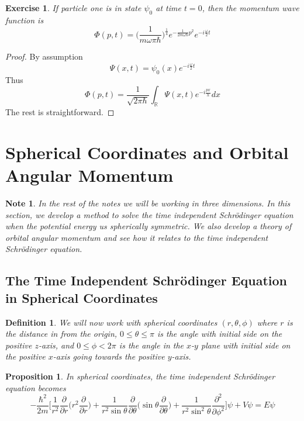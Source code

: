 \documentclass[12pt]{amsart}
\newtheorem{prop}[thm]{Proposition}
\newtheorem{defn}[thm]{Definition}
\newtheorem{note}[thm]{Note}
\newtheorem{ex}[thm]{Exercise}
\newcommand{\sch}{Schr\"{o}dinger }
\newcommand{\om}{\omega}
\newcommand{\R}{\mathbb{R}}
\newcommand{\p}[1]{\frac{\partial}{\partial{#1}}}
\begin{document}
\begin{ex}
If particle one is in state $\psi_0$ at time $t=0$, then the momentum wave function is $$\Phi(p,t) = \bigg(\frac{1}{m \om \pi \hbar}\bigg)^{\frac{1}{4}}e^{-\frac{1}{2m \om \hbar}p^2}e^{-i \frac{\om}{2}t}$$
\end{ex}

\begin{proof}
By assumption $$\Psi(x,t) = \psi_0(x)e^{-i \frac{\om}{2}t}$$ Thus $$\Phi(p,t) = \frac{1}{\sqrt{2 \pi \hbar}}\int_{\R}\Psi(x,t)e^{-i\frac{px}{h}}dx$$
The rest is straightforward.
\end{proof}
\newpage

\section{Spherical Coordinates and Orbital Angular Momentum}
\begin{note}
In the rest of the notes we will be working in three dimensions. In this section, we develop a method to solve the time independent \sch equation when the potential energy us spherically symmetric. We also develop a theory of orbital angular momentum and see how it relates to the time independent \sch equation. 
\end{note}


\subsection{The Time Independent \sch Equation in Spherical Coordinates}
\begin{defn}
We will now work with spherical coordinates $(r, \theta, \phi)$ where $r$ is the distance in from the origin, $0 \leq \theta \leq \pi$ is the angle with initial side on the positive $z$-axis, and $0 \leq \phi < 2\pi$ is the angle in the $x$-$y$ plane with initial side on the positive $x$-axis going towards the positive $y$-axis.
\end{defn}

\begin{prop}
In spherical coordinates, the time independent \sch equation becomes $$-\frac{\hbar^2}{2m}\bigg[ \frac{1}{r^2} \p{r}\bigg( r^2 \p{r}\bigg) + \frac{1}{r^2 \sin \theta} \p{\theta} \bigg( \sin \theta \p{\theta}\bigg) + \frac{1}{r^2 \sin^2 \theta} \frac{\partial^2}{\partial \phi^2}  \bigg] \psi + V \psi = E \psi$$
\end{prop}
\end{document}
